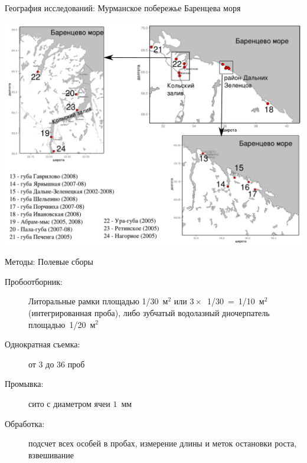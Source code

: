 \documentclass{beamer}
\begin{document}
\begin{frame}{География исследований: Мурманское побережье Баренцева моря}
 \begin{center}
	\includegraphics[height=.8\textheight]{./Barents_sea.pdf}
 \end{center}
\end{frame}

\begin{frame}{Методы: Полевые сборы}
 \begin{description}
 		\item [Пробоотборник:] Литоральные рамки площадью 1/30~м$^2$ или $3 \times$~1/30~=~1/10~м$^2$ (интегрированная проба), либо зубчатый водолазный дночерпатель площадью~1/20~м$^2$
		\item [Однократная съемка:] от 3 до 36 проб
		\item [Промывка:] сито с диаметром ячеи $1$~мм 
		\item [Обработка:] подсчет всех особей в пробах, измерение длины и меток остановки роста, взвешивание
	\end{description}
\end{frame}
\end{document}
